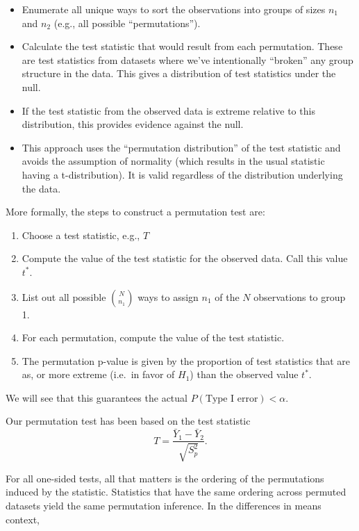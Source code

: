 \documentclass[
  letterpaper,
  DIV=11,
  numbers=noendperiod]{scrreport}
\providecommand{\tightlist}{%
  \setlength{\itemsep}{0pt}\setlength{\parskip}{0pt}}\usepackage{longtable,booktabs,array}
\begin{document}
\begin{itemize}
\tightlist
\item
  Enumerate all unique ways to sort the observations into groups of
  sizes \(n_1\) and \(n_2\) (e.g., all possible ``permutations'').
\item
  Calculate the test statistic that would result from each permutation.
  These are test statistics from datasets where we've intentionally
  ``broken'' any group structure in the data. This gives a distribution
  of test statistics under the null.
\item
  If the test statistic from the observed data is extreme relative to
  this distribution, this provides evidence against the null.
\item
  This approach uses the ``permutation distribution'' of the test
  statistic and avoids the assumption of normality (which results in the
  usual statistic having a t-distribution). It is valid regardless of
  the distribution underlying the data.
\end{itemize}

More formally, the steps to construct a permutation test are:

\begin{enumerate}
\def\labelenumi{\arabic{enumi}.}
\tightlist
\item
  Choose a test statistic, e.g., \(T\)
\item
  Compute the value of the test statistic for the observed data. Call
  this value \(t^*\).
\item
  List out all possible \({N \choose n_1}\) ways to assign \(n_1\) of
  the \(N\) observations to group 1.
\item
  For each permutation, compute the value of the test statistic.
\item
  The permutation p-value is given by the proportion of test statistics
  that are as, or more extreme (i.e.~in favor of \(H_1\)) than the
  observed value \(t^*\).
\end{enumerate}

We will see that this guarantees the actual
\(P(\text{Type I error}) < \alpha\).

Our permutation test has been based on the test statistic \[
T = \frac{\bar Y_{1} - \bar Y_2}{\sqrt{S_p^2}}.
\]

For all one-sided tests, all that matters is the ordering of the
permutations induced by the statistic. Statistics that have the same
ordering across permuted datasets yield the same permutation inference.
In the differences in means context,
\end{document}
